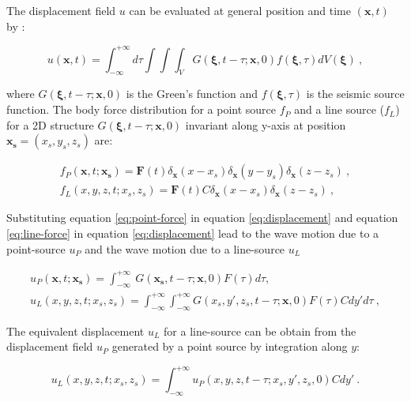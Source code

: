 \documentclass[manuscript,revised]{geophysics}
\begin{document}
\noindent The displacement field $u$ can be evaluated at general position and time $(\mathbf{x},t)$ by \citep{aki2002quantitative}:

\begin{equation}
	u(\mathbf{x},t) = \int_{-\infty}^{+\infty}d\tau \int \int \int_{V} G(\mathbf{\xi},t-\tau;\mathbf{x},0)f(\mathbf{\xi},\tau)dV(\mathbf{\xi})\ ,
	\label{eq:displacement}
\end{equation}

\noindent where $G(\mathbf{\xi},t-\tau;\mathbf{x},0)$ is the Green's function and $f(\mathbf{\xi},\tau)$ is the seismic source function. The body force distribution for a point source $f_{P}$ and a line source ($f_{L}$) for a 2D structure $G(\mathbf{\xi},t-\tau;\mathbf{x},0)$ invariant along y-axis at position $ \mathbf{x_{s}}=(x_{s}, y_{s},z_{s}) $ are:

\begin{eqnarray} 
	f_{P}(\mathbf{x},t;\mathbf{x_{s}})=\mathbf{F}(t)\delta_{\mathbf{x}}(x-x_{s})\delta_{\mathbf{x}}(y-y_{s})\delta_{\mathbf{x}}(z-z_{s})\ , \label{eq:point-force} \\
	f_{L}(x,y,z,t;x_{s},z_{s})=\mathbf{F}(t) C \delta_{\mathbf{x}}(x-x_{s})\delta_{\mathbf{x}}(z-z_{s})\ , \label{eq:line-force}
\end{eqnarray}

\noindent Substituting equation \ref{eq:point-force} in equation \ref{eq:displacement} and equation \ref{eq:line-force} in equation \ref{eq:displacement} lead to the wave motion due to a point-source $u_{P}$ and the wave motion due to a line-source $u_{L}$ 

\begin{eqnarray}
	u_{P}(\mathbf{x},t;\mathbf{x_{s}})=\int_{-\infty}^{+\infty}\ G(\mathbf{x_{s}},t-\tau;\mathbf{x},0)F(\tau)d\tau, \label{eq:point-displacement} \\
	u_{L}(x,y,z,t;x_{s},z_{s})=\int_{-\infty}^{+\infty} \int_{-\infty}^{+\infty} G(x_{s},y',z_{s},t-\tau;\mathbf{x},0)F(\tau)Cdy'd\tau\ , \label{eq:line-displacement}
\end{eqnarray}

\noindent The equivalent displacement $u_{L}$ for a line-source can be obtain from the displacement field $u_{P}$ generated by a point source by integration along $y$:

\begin{equation}
	u_{L}(x,y,z,t;x_{s},z_{s})=\int_{-\infty}^{+\infty}u_{P}(x,y,z,t-\tau;x_{s},y',z_{s},0)Cdy'\ .
	\label{eq:line-point-relation}
\end{equation}
\end{document}
